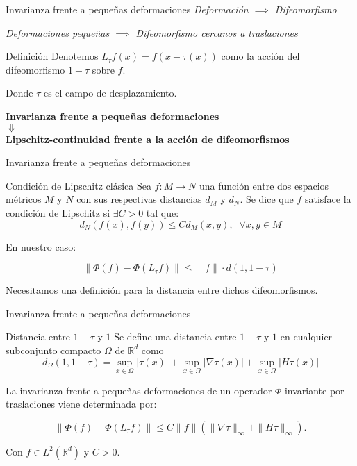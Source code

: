 \documentclass[aspectratio=43]{beamer}
\begin{document}
  \begin{frame}{Invarianza frente a pequeñas deformaciones}
    \textcolor{tudCyan}{\textit{Deformación $\implies$ Difeomorfismo}}

    \textcolor{tudCyan}{\textit{Deformaciones pequeñas $\implies$ Difeomorfismo cercanos a traslaciones}}  

    \begin{block}{Definición}
      Denotemos $L_{\tau} f(x)=f(x-\tau(x))$ como la acción del difeomorfismo $1-\tau$ sobre $f$.

      Donde $\tau$ es el campo de desplazamiento. 
    \end{block}

    \textcolor{tudCyan}{\textbf{\centering Invarianza frente a pequeñas deformaciones \\ \centering $\Downarrow$ \\ \centering Lipschitz-continuidad frente a la acción de difeomorfismos}}  
  \end{frame}

  \begin{frame}{Invarianza frente a pequeñas deformaciones}

    \begin{block}{Condición de Lipschitz clásica}
      Sea $f: M \rightarrow N$ una función entre dos espacios métricos $M$ y $N$ con sus respectivas distancias $d_M$ y $d_N$. Se dice que $f$ satisface la condición de Lipschitz si $\exists C>0$ tal que: 
      $$d_N(f(x),f(y))\leq C d_M(x,y), \; \; \forall x,y \in M$$ 
    \end{block}

    En nuestro caso: 

    \begin{equation}
      \|\Phi(f) - \Phi(L_\tau f) \| \leq \|f\| · d(1, 1-\tau)
    \end{equation}

    Necesitamos una definición para la distancia entre dichos difeomorfismos.
  \end{frame}


  \begin{frame}{Invarianza frente a pequeñas deformaciones}
    \begin{block}{Distancia entre $1-\tau$ y $1$}
      Se define una distancia entre $1-\tau$ y $1$ en cualquier subconjunto compacto $\Omega$ de $\mathbb{R}^d$ como 
      \begin{equation} \label{eq::distancia}
        d_\Omega(1,1-\tau) = \sup_{x \in \Omega} |\tau (x)| + \sup_{x \in \Omega} |\nabla \tau (x)| + \sup_{x \in \Omega}|H \tau (x)|
      \end{equation}
    \end{block}

    La invarianza frente a pequeñas deformaciones de un operador $\Phi$ invariante por traslaciones viene determinada por: 

    \begin{equation}
      \| \Phi(f)-\Phi(L_{\tau}f)\|\leq C\|f\|(\|\nabla\tau\|_{\infty} + \|H \tau\|_\infty).
    \end{equation}

    Con $f\in L^2(\mathbb{R}^d)$ y $C>0$.
  \end{frame}
\end{document}
